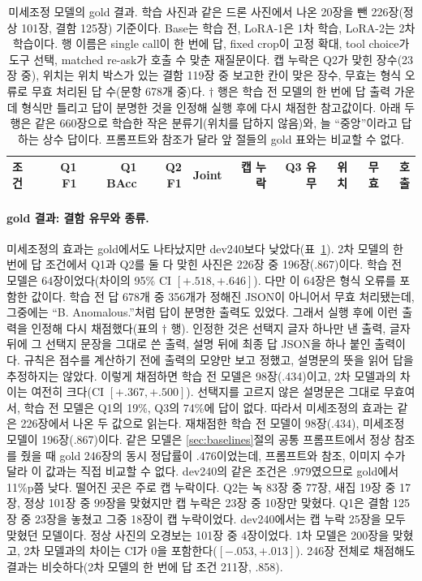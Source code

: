 \documentclass[11pt]{article}
\begin{document}
\begin{table}[t]
\centering
\caption{미세조정 모델의 gold 결과. 학습 사진과 같은 드론 사진에서 나온 20장을 뺀 226장(정상 101장, 결함 125장) 기준이다. Base는 학습 전, LoRA-1은 1차 학습, LoRA-2는 2차 학습이다. 행 이름은 single call이 한 번에 답, fixed crop이 고정 확대, tool choice가 도구 선택, matched re-ask가 호출 수 맞춘 재질문이다. 캡 누락은 Q2가 맞힌 장수(23장 중), 위치는 위치 박스가 있는 결함 119장 중 보고한 칸이 맞은 장수, 무효는 형식 오류로 무효 처리된 답 수(문항 678개 중)다. $\dagger$ 행은 학습 전 모델의 한 번에 답 출력 가운데 형식만 틀리고 답이 분명한 것을 인정해 실행 후에 다시 채점한 참고값이다. 아래 두 행은 같은 660장으로 학습한 작은 분류기(위치를 답하지 않음)와, 늘 ``중앙''이라고 답하는 상수 답이다. 프롬프트와 참조가 달라 앞 절들의 gold 표와는 비교할 수 없다.}
\label{tab:sftgold}
\small
\begin{tabular}{lrrrrrrrrr}
\toprule
조건 & Q1 F1 & Q1 BAcc & Q2 F1 & Joint & 캡 누락 & Q3 유무 & 위치 & 무효 & 호출 \\
\midrule

\bottomrule
\end{tabular}
\end{table}

\paragraph{gold 결과: 결함 유무와 종류.} 미세조정의 효과는 gold에서도 나타났지만 dev240보다 낮았다(표~\ref{tab:sftgold}). 2차 모델의 한 번에 답 조건에서 Q1과 Q2를 둘 다 맞힌 사진은 226장 중 196장(.867)이다. 학습 전 모델은 64장이었다(차이의 95\% CI $[+.518,+.646]$). 다만 이 64장은 형식 오류를 포함한 값이다. 학습 전 답 678개 중 356개가 정해진 JSON이 아니어서 무효 처리됐는데, 그중에는 ``B. Anomalous.''처럼 답이 분명한 출력도 있었다. 그래서 실행 후에 이런 출력을 인정해 다시 채점했다(표의 $\dagger$ 행). 인정한 것은 선택지 글자 하나만 낸 출력, 글자 뒤에 그 선택지 문장을 그대로 쓴 출력, 설명 뒤에 최종 답 JSON을 하나 붙인 출력이다. 규칙은 점수를 계산하기 전에 출력의 모양만 보고 정했고, 설명문의 뜻을 읽어 답을 추정하지는 않았다. 이렇게 채점하면 학습 전 모델은 98장(.434)이고, 2차 모델과의 차이는 여전히 크다(CI $[+.367,+.500]$). 선택지를 고르지 않은 설명문은 그대로 무효여서, 학습 전 모델은 Q1의 19\%, Q3의 74\%에 답이 없다. 따라서 미세조정의 효과는 같은 226장에서 나온 두 값으로 읽는다. 재채점한 학습 전 모델이 98장(.434), 미세조정 모델이 196장(.867)이다. 같은 모델은 \ref{sec:baselines}절의 공통 프롬프트에서 정상 참조를 줬을 때 gold 246장의 동시 정답률이 .476이었는데, 프롬프트와 참조, 이미지 수가 달라 이 값과는 직접 비교할 수 없다. dev240의 같은 조건은 .979였으므로 gold에서 11\%p쯤 낮다. 떨어진 곳은 주로 캡 누락이다. Q2는 녹 83장 중 77장, 새집 19장 중 17장, 정상 101장 중 99장을 맞혔지만 캡 누락은 23장 중 10장만 맞혔다. Q1은 결함 125장 중 23장을 놓쳤고 그중 18장이 캡 누락이었다. dev240에서는 캡 누락 25장을 모두 맞혔던 모델이다. 정상 사진의 오경보는 101장 중 4장이었다. 1차 모델은 200장을 맞혔고, 2차 모델과의 차이는 CI가 0을 포함한다($[-.053,+.013]$). 246장 전체로 채점해도 결과는 비슷하다(2차 모델의 한 번에 답 조건 211장, .858).
\end{document}
